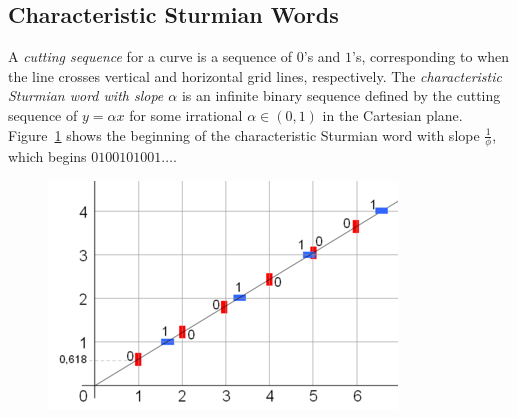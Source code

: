 \documentclass[landscape,usenames,dvipsnames, 25pt]{sciposter}
\begin{document}
\begin{multicols}{3}

\section*{Characteristic Sturmian Words}
A \emph{cutting sequence} for a curve is a sequence of $0$'s and $1$'s, corresponding to when the line crosses vertical and horizontal grid lines, respectively.
The \emph{characteristic Sturmian word with slope $\alpha$} is an infinite binary sequence defined by the cutting sequence of $y = \alpha x$ for some irrational $\alpha \in (0,1)$ in the Cartesian plane.
Figure~\ref{fig:fib_word} shows the beginning of the characteristic Sturmian word with slope $\frac{1}{\phi}$, which begins $0100101001\ldots$.

\begin{figure}
	\centering
\begin{minipage}{0.6\columnwidth}
\centering
    \includegraphics[width=0.7\columnwidth]{images/Fibonacci_word_cutting_sequence.png}
	\label{fig:fib_word}
\end{minipage}
\end{figure}


\end{multicols}
\end{document}
